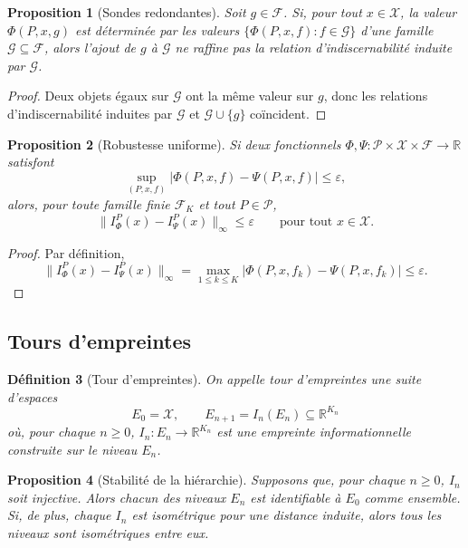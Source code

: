 \documentclass[11pt,a4paper,openany]{book}
\newtheorem{definition}{Définition}[chapter]
\newtheorem{proposition}[definition]{Proposition}
\begin{document}
\begin{proposition}[Sondes redondantes]
Soit \(g\in\mathcal F\). Si, pour tout \(x\in\mathcal X\), la valeur \(\Phi(P,x,g)\) est déterminée par les valeurs \(\{\Phi(P,x,f):f\in\mathcal G\}\) d'une famille \(\mathcal G\subseteq\mathcal F\), alors l'ajout de \(g\) à \(\mathcal G\) ne raffine pas la relation d'indiscernabilité induite par \(\mathcal G\).
\end{proposition}

\begin{proof}
Deux objets égaux sur \(\mathcal G\) ont la même valeur sur \(g\), donc les relations d'indiscernabilité induites par \(\mathcal G\) et \(\mathcal G\cup\{g\}\) coïncident.
\end{proof}

\begin{proposition}[Robustesse uniforme]
Si deux fonctionnels \(\Phi,\Psi:\mathcal P\times\mathcal X\times\mathcal F\to\mathbb R\) satisfont
\[
\sup_{(P,x,f)}|\Phi(P,x,f)-\Psi(P,x,f)|\le \varepsilon,
\]
alors, pour toute famille finie \(\mathcal F_K\) et tout \(P\in\mathcal P\),
\[
\|I_\Phi^P(x)-I_\Psi^P(x)\|_\infty\le \varepsilon
\qquad
\text{pour tout }x\in\mathcal X.
\]
\end{proposition}

\begin{proof}
Par définition,
\[
\|I_\Phi^P(x)-I_\Psi^P(x)\|_\infty
=
\max_{1\le k\le K} |\Phi(P,x,f_k)-\Psi(P,x,f_k)|
\le \varepsilon.
\]
\end{proof}

\subsection{Tours d'empreintes}

\begin{definition}[Tour d'empreintes]
On appelle \emph{tour d'empreintes} une suite d'espaces
\[
E_0=\mathcal X,\qquad E_{n+1}=I_n(E_n)\subseteq \mathbb R^{K_n}
\]
où, pour chaque \(n\ge 0\), \(I_n:E_n\to \mathbb R^{K_n}\) est une empreinte informationnelle construite sur le niveau \(E_n\).
\end{definition}

\begin{proposition}[Stabilité de la hiérarchie]
Supposons que, pour chaque \(n\ge 0\), \(I_n\) soit injective. Alors chacun des niveaux \(E_n\) est identifiable à \(E_0\) comme ensemble. Si, de plus, chaque \(I_n\) est isométrique pour une distance induite, alors tous les niveaux sont isométriques entre eux.
\end{proposition}
\end{document}
